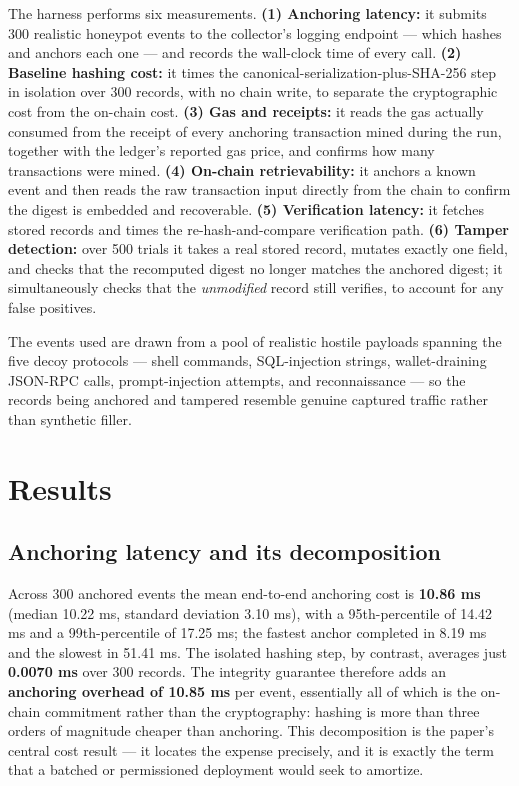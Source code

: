 \documentclass[conference]{IEEEtran}
\begin{document}
The harness performs six measurements. \textbf{(1) Anchoring latency:} it submits 300 realistic honeypot events to the collector's logging endpoint --- which hashes and anchors each one --- and records the wall-clock time of every call. \textbf{(2) Baseline hashing cost:} it times the canonical-serialization-plus-SHA-256 step in isolation over 300 records, with no chain write, to separate the cryptographic cost from the on-chain cost. \textbf{(3) Gas and receipts:} it reads the gas actually consumed from the receipt of every anchoring transaction mined during the run, together with the ledger's reported gas price, and confirms how many transactions were mined. \textbf{(4) On-chain retrievability:} it anchors a known event and then reads the raw transaction input directly from the chain to confirm the digest is embedded and recoverable. \textbf{(5) Verification latency:} it fetches stored records and times the re-hash-and-compare verification path. \textbf{(6) Tamper detection:} over 500 trials it takes a real stored record, mutates exactly one field, and checks that the recomputed digest no longer matches the anchored digest; it simultaneously checks that the \emph{unmodified} record still verifies, to account for any false positives.

The events used are drawn from a pool of realistic hostile payloads spanning the five decoy protocols --- shell commands, SQL-injection strings, wallet-draining JSON-RPC calls, prompt-injection attempts, and reconnaissance --- so the records being anchored and tampered resemble genuine captured traffic rather than synthetic filler.

\section{Results}

\subsection{Anchoring latency and its decomposition}

Across 300 anchored events the mean end-to-end anchoring cost is \textbf{10.86 ms} (median 10.22 ms, standard deviation 3.10 ms), with a 95th-percentile of 14.42 ms and a 99th-percentile of 17.25 ms; the fastest anchor completed in 8.19 ms and the slowest in 51.41 ms. The isolated hashing step, by contrast, averages just \textbf{0.0070 ms} over 300 records. The integrity guarantee therefore adds an \textbf{anchoring overhead of 10.85 ms} per event, essentially all of which is the on-chain commitment rather than the cryptography: hashing is more than three orders of magnitude cheaper than anchoring. This decomposition is the paper's central cost result --- it locates the expense precisely, and it is exactly the term that a batched or permissioned deployment would seek to amortize.
\end{document}
